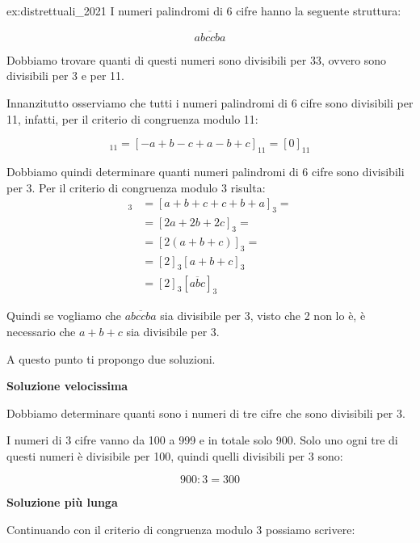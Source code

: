 \begin{soluzione}{ex:distrettuali_2021}
    I numeri palindromi di 6 cifre hanno la seguente struttura:

    \begin{equation*}
        \overline{abccba}
    \end{equation*}

    Dobbiamo trovare quanti di questi numeri sono divisibili per 33, ovvero sono divisibili per 3 e per 11.

    Innanzitutto osserviamo che tutti i numeri palindromi di 6 cifre sono divisibili per 11, infatti, per il
    criterio di congruenza modulo 11:

    \begin{equation*}
        [\overline{abccba}]_{11} = [-a + b - c + a - b + c]_{11} = [0]_{11}
    \end{equation*}

    Dobbiamo quindi determinare quanti numeri palindromi di 6 cifre sono divisibili per 3.
    Per il criterio di congruenza modulo 3 risulta:
    \begin{align*}
        [\overline{abccba}]_3 &= [a + b + c + c + b + a]_3 = \\
        &= [2a + 2b + 2c]_3 = \\
        &= [2(a+b+c)]_3 = \\
        &= [2]_3[a + b + c]_3 \\
        &= [2]_3[\overline{abc}]_3
    \end{align*}

    Quindi se vogliamo che $\overline{abccba}$ sia divisibile per 3, visto che 2 non lo è, è necessario che $a + b + c$
    sia divisibile per 3.

    A questo punto ti propongo due soluzioni.

    \bigskip
    \textbf{Soluzione velocissima}

    Dobbiamo determinare quanti sono i numeri di tre cifre che sono divisibili per 3.

    I numeri di 3 cifre vanno da 100 a 999 e in totale solo 900.
    Solo uno ogni tre di questi numeri è divisibile per 100, quindi quelli divisibili per 3 sono:

    \begin{equation*}
        900 : 3 = 300
    \end{equation*}

    \bigskip
    \textbf{Soluzione più lunga}

    Continuando con il criterio di congruenza modulo 3 possiamo scrivere:


\end{soluzione}
